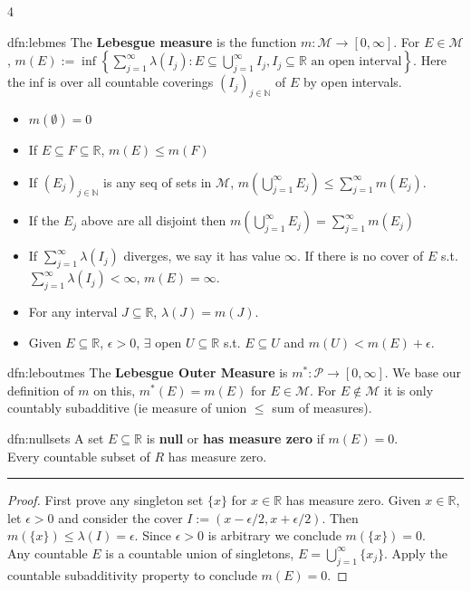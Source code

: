 \documentclass[landscape, 8pt]{extarticle}
\begin{document}
\begin{multicols*}{4}
		\begin{mdfn}{dfn:lebmes}{ }
			The \textbf{Lebesgue measure} is the function $m : \mathcal{M} \to [0, \infty]$. For $E\in \mathcal{M}$, $m(E) := \inf \left\{\sum_{j=1}^{\infty}\lambda(I_j) : E \subseteq\bigcup_{j=1}^\infty I_j, I_j \subseteq \mathbb{R} \text{ an open interval}\right\}$. Here the inf is over all countable coverings $(I_j)_{j\in \mathbb{N}}$ of $E$ by open intervals.
			\begin{itemize}
				\item[*] $m(\emptyset) = 0$
				\item[*] If $E \subseteq F \subseteq \mathbb{R}$, $m(E) \le m(F)$
				\item[*] If $(E_j)_{j\in \mathbb{N}}$ is any seq of sets in $\mathcal{M}$, $m\left(\bigcup_{j=1}^{\infty} E_j\right) \le \sum_{j=1}^{\infty}m(E_j)$.
				\item[*] If the $E_j$ above are all disjoint then $m\left(\bigcup_{j=1}^{\infty} E_j\right) = \sum_{j=1}^{\infty}m(E_j)$
				\item If $\sum_{j=1}^{\infty}\lambda(I_j)$ diverges, we say it has value $\infty$. If there is no cover of $E$ s.t. $\sum_{j=1}^{\infty}\lambda(I_j) < \infty$, $m(E) = \infty$.
				\item For any interval $J \subseteq\mathbb{R}$, $\lambda(J) = m(J)$.
				\item Given $E \subseteq\mathbb{R}$, $\epsilon > 0$, $\exists$ open $U \subseteq \mathbb{R}$ s.t. $E \subseteq U$ and $m(U) < m(E) +\epsilon$.
			\end{itemize}
			
		\end{mdfn}
		
		
		\begin{dfn}{dfn:leboutmes}{ }
			The \textbf{Lebesgue Outer Measure} is $m^* : \mathcal{P} \to [0, \infty]$. We base our definition of $m$ on this, $m^*(E) = m(E)$ for $E\in \mathcal{M}$. For $E \notin \mathcal{M}$ it is only countably subadditive (ie measure of union $\le$ sum of measures).
			
		\end{dfn}
		
		
		\begin{dfn}{dfn:nullsets}{ }
			A set $E \subseteq \mathbb{R}$ is \textbf{null} or \textbf{has measure zero} if $m(E) = 0$.\\
			Every countable subset of $R$ has measure zero.
			\vspace{1pt}
			\hrule	
			\vspace{-6pt}
			\begin{proof}
				First prove any singleton set $\{x\}$ for $x\in \mathbb{R}$ has measure zero. Given $x\in \mathbb{R}$, let $\epsilon > 0$ and consider the cover $I  := \left(x-\epsilon/2, x +\epsilon/2\right)$. Then $m(\{x\}) \le \lambda(I) =\epsilon$. Since $\epsilon > 0$ is arbitrary we conclude $m(\{x\}) = 0$. \\
				Any countable $E$ is a countable union of singletons, $E = \bigcup_{j=1}^\infty \{x_j\}$. Apply the countable subadditivity property to conclude $m(E) = 0$.
			\end{proof}
			

\end{dfn}
\end{multicols*}
\end{document}
